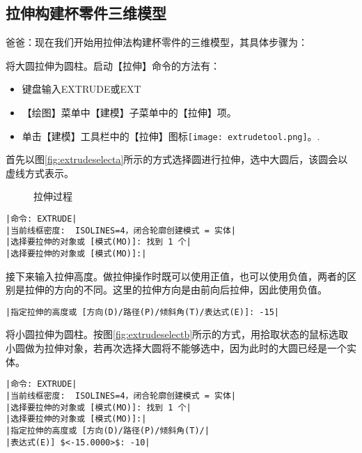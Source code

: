 \subsection{拉伸构建杯零件三维模型}
爸爸：现在我们开始用拉伸法构建杯零件的三维模型，其具体步骤为：
\begin{procedure}
\item 将大圆拉伸为圆柱。启动【拉伸】命令的方法有：
\begin{itemize}
\item 键盘输入EXTRUDE或EXT
\item 【绘图】菜单中【建模】子菜单中的【拉伸】项。
\item 单击【建模】工具栏中的【拉伸】图标\texttt{[image: extrudetool.png]}。.
\end{itemize}
首先以图\ref{fig:extrudeselecta}所示的方式选择圆进行拉伸，选中大圆后，该圆会以虚线方式表示。
\begin{figure}[htbp]
\centering
{}\hspace{20pt}
\caption{拉伸过程}
\end{figure}
\begin{lstlisting}
|命令: EXTRUDE|
|当前线框密度:  ISOLINES=4，闭合轮廓创建模式 = 实体|
|选择要拉伸的对象或 [模式(MO)]: 找到 1 个|
|选择要拉伸的对象或 [模式(MO)]:|
\end{lstlisting}
接下来输入拉伸高度。做拉伸操作时既可以使用正值，也可以使用负值，两者的区别是拉伸的方向的不同。这里的拉伸方向是由前向后拉伸，因此使用负值。
\begin{lstlisting}
|指定拉伸的高度或 [方向(D)/路径(P)/倾斜角(T)/表达式(E)]: -15|
\end{lstlisting}
\item 将小圆拉伸为圆柱。按图\ref{fig:extrudeselectb}所示的方式，用拾取状态的鼠标选取小圆做为拉伸对象，若再次选择大圆将不能够选中，因为此时的大圆已经是一个实体。
\begin{lstlisting}
|命令: EXTRUDE|
|当前线框密度:  ISOLINES=4，闭合轮廓创建模式 = 实体|
|选择要拉伸的对象或 [模式(MO)]: 找到 1 个|
|选择要拉伸的对象或 [模式(MO)]:|
|指定拉伸的高度或 [方向(D)/路径(P)/倾斜角(T)/|
|表达式(E)] $<-15.0000>$: -10|
\end{lstlisting}


\end{procedure}
